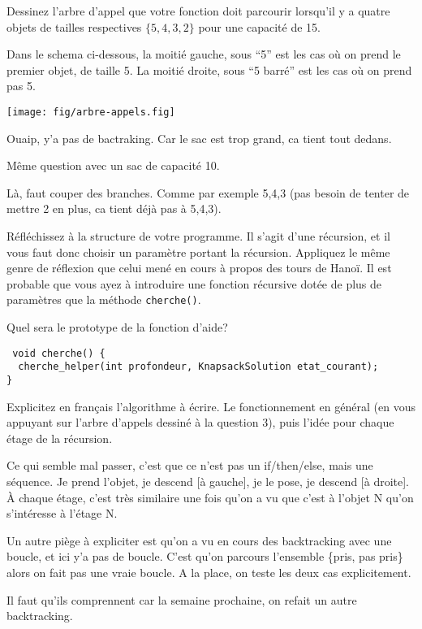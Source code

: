 \documentclass[10pt]{article}\usepackage[correction,nu]{esial}%
\begin{document}
\Question Dessinez l'arbre d'appel que votre fonction doit parcourir lorsqu'il
y a quatre objets de tailles respectives $\{ 5, 4, 3, 2 \}$ pour une capacité
de 15.

\begin{Reponse}
  Dans le schema ci-dessous, la moitié gauche, sous ``5'' est les cas où on
  prend le premier objet, de taille 5. La moitié droite, sous ``5 barré'' est
  les cas où on prend pas 5.

  \texttt{[image: fig/arbre-appels.fig]}  

  Ouaip, y'a pas de bactraking. Car le sac est trop grand, ca tient tout dedans.
\end{Reponse}

\Question Même question avec un sac de capacité 10.

\begin{Reponse}
  Là, faut couper des branches. Comme par exemple 5,4,3 (pas besoin de tenter
  de mettre 2 en plus, ca tient déjà pas à 5,4,3).
\end{Reponse}

\medskip Réfléchissez à la structure de votre programme. Il s'agit d'une
récursion, et il vous faut donc choisir un paramètre portant la
récursion. Appliquez le même genre de réflexion que celui mené en cours à
propos des tours de Hanoï. Il est probable que vous ayez à introduire une
fonction récursive dotée de plus de paramètres que la méthode
\texttt{cherche()}.

\Question Quel sera le prototype de la fonction d'aide?

\begin{Reponse}
  \noindent\texttt{%
  void cherche() \{\\
  \null~~cherche\_helper(int profondeur, KnapsackSolution etat\_courant);\\
  \}    
  }
\end{Reponse}

\Question Explicitez en français l'algorithme à écrire. Le fonctionnement en
général (en vous appuyant sur l'arbre d'appels dessiné à la question 3), puis
l'idée pour chaque étage de la récursion.

\begin{Reponse}
  Ce qui semble mal passer, c'est que ce n'est pas un if/then/else, mais une
  séquence. Je prend l'objet, je descend [à gauche], je le pose, je descend [à
  droite]. À chaque étage, c'est très similaire une fois qu'on a vu que c'est
  à  l'objet N qu'on s'intéresse à l'étage N.

  Un autre piège à expliciter est qu'on a vu en cours des backtracking avec une
  boucle, et ici y'a pas de boucle. C'est qu'on parcours l'ensemble \{pris, pas
  pris\} alors on fait pas une vraie boucle. A la place, on teste les deux cas
  explicitement.

  Il faut qu'ils comprennent car la semaine prochaine, on refait un autre
  backtracking.
\end{Reponse}
\end{document}
